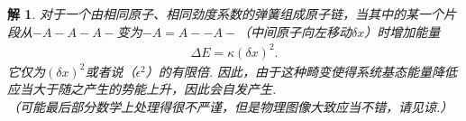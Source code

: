\documentclass[UTF8,10pt,a4paper]{article}
\theoremstyle{Problem}
\theoremstyle{Solution}
\newtheorem*{sol}{解}
\begin{document}
\begin{sol}
    对于一个由相同原子、相同劲度系数的弹簧组成原子链，当其中的某一个片段从$-A-A-A-$变为$-A=A--A-$（中间原子向左移动$\delta x$）时增加能量
    \begin{align}
        \Delta E=\kappa(\delta x)^2.
    \end{align}
    它仅为$(\delta x)^2$或者说（$\epsilon^2$）的有限倍. 因此，由于这种畸变使得系统基态能量降低应当大于随之产生的势能上升，因此会自发产生.\\
    （可能最后部分数学上处理得很不严谨，但是物理图像大致应当不错，请见谅.）
\end{sol}
\end{document}
